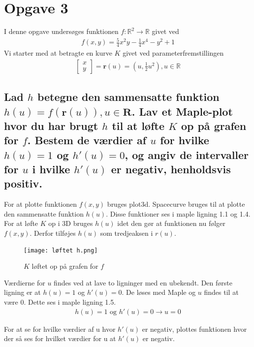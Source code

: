 \section{Opgave 3}
I denne opgave undersøges funktionen $f:\mathbb{R}^2 \rightarrow \mathbb{R}$ givet ved
\begin{align*}
f(x,y) = \frac{5}{4} x^2 y-\frac14 x^4 -y^2+1
\end{align*}
Vi starter med at betragte en kurve $K$ givet ved parameterfremstillingen
\begin{align}
\left[
    \begin{array}{c}
        x\\y
    \end{array}
\right] 
= \textbf{r}(u) = \left(u,\frac12 u^2 \right), u\in \mathbb{R}
\end{align}
\subsection{Lad $h$ betegne den sammensatte funktion $h(u)=f(\textbf{r}(u)),u\in \textbf{R}$. Lav et Maple-plot hvor du har brugt $h$ til at løfte $K$ op på grafen for $f$. Bestem de værdier af $u$ for hvilke $h(u)=1$ og $h'(u)=0$, og angiv de intervaller for $u$ i hvilke $h'(u)$ er negativ, henholdsvis positiv.}

For at plotte funktionen $f(x,y)$ bruges plot3d. Spacecurve bruges til at plotte den sammensatte funktion $h(u)$. Disse funktioner ses i maple ligning 1.1 og 1.4. For at løfte $K$ op i 3D bruges $h(u)$ idet den gør at funktionen nu følger $f(x,y)$. Derfor tilføjes $h(u)$ som tredjeaksen i $r(u)$.

\begin{figure}[htp]
    \centering
    \texttt{[image: løftet h.png]}
        \caption{$K$ løftet op på grafen for $f$}
    \label{hlift}
\end{figure}

Værdierne for $u$ findes ved at lave to ligninger med en ubekendt. Den første ligning er at $h(u)=1$ og $h'(u)=0$. De løses med Maple og $u$ findes til at være 0. Dette ses i maple ligning 1.5.
\begin{align}
    h(u)=1 \text{ og } h'(u)=0 \rightarrow u=0
\end{align}

For at se for hvilke værdier af u hvor $h'(u)$ er negativ, plottes funktionen hvor der så ses for hvilket værdier for u at $h'(u)$ er negativ.

